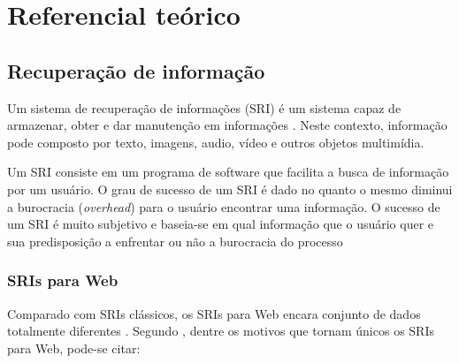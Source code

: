 
\pagebreak
\chapter{Referencial teórico}

\pagebreak
\section{Recuperação de informação}

Um sistema de recuperação de informações (SRI) é um sistema capaz de armazenar, obter e dar manutenção em informações \cite[p. 2]{kowalski}. Neste contexto, informação pode composto por texto, imagens, audio, vídeo e outros objetos multimídia.

Um SRI consiste em um programa de software que facilita a busca de informação por um usuário. O grau de sucesso de um SRI é dado no quanto o mesmo diminui a burocracia (\emph{overhead}) para o usuário encontrar uma informação. O sucesso de um SRI é muito subjetivo e baseia-se em qual informação que o usuário quer e sua predisposição a enfrentar ou não a burocracia do processo \cite[p. 4]{kowalsky}

\subsection{SRIs para Web}

Comparado com SRIs clássicos, os SRIs para Web encara conjunto de dados totalmente diferentes \cite[p. 2]{surveyir}. Segundo \cite{surveyir}, dentre os motivos que tornam únicos os SRIs para Web, pode-se citar:

